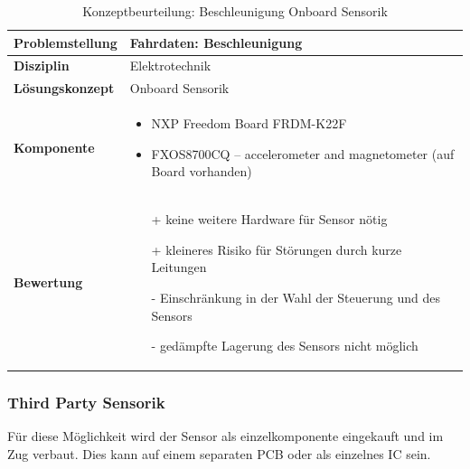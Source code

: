 \documentclass[../../main.tex]{subfiles}
\begin{document}
    \begin{flushleft}
        \begin{table}[H]
        \begin{tabular}{ | l | p{11cm} |}
        \hline
        \textbf{Problemstellung} & Fahrdaten: Beschleunigung \\ \hline
        \textbf{Disziplin} & Elektrotechnik \\ \hline
        \textbf{Lösungskonzept} & Onboard Sensorik\\ \hline
        \textbf{Komponente} & \begin{itemize}
            \item NXP Freedom Board FRDM-K22F
            \item FXOS8700CQ – accelerometer and magnetometer (auf Board vorhanden)
            \end{itemize}\\ \hline
        \textbf{Bewertung} &  \begin{itemize}
                                \item[+] keine weitere Hardware für Sensor nötig
                                \item[+] kleineres Risiko für Störungen durch kurze Leitungen
                                \item[-] Einschränkung in der Wahl der Steuerung und des Sensors
                                \item[-] gedämpfte Lagerung des Sensors nicht möglich
                              \end{itemize} \\ \hline
        \end{tabular}
        \caption{Konzeptbeurteilung: Beschleunigung Onboard Sensorik}
        \label{tab:fahr_Onboard_Sensorik}
    \end{table}
    \end{flushleft}

    \subsubsection{Third Party Sensorik}
    Für diese Möglichkeit wird der Sensor als einzelkomponente eingekauft und im Zug verbaut. Dies kann auf einem separaten PCB oder als einzelnes IC sein. 
\end{document}
